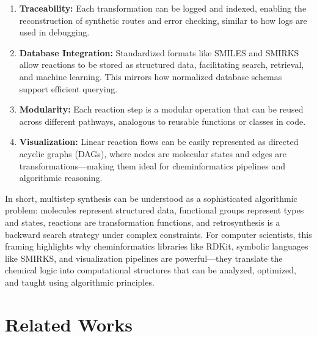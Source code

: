 \documentclass[12pt]{article}
\begin{document}
\begin{enumerate}
    \item \textbf{Traceability:} Each transformation can be logged and indexed, enabling the reconstruction of synthetic routes and error checking, similar to how logs are used in debugging.
    \item \textbf{Database Integration:} Standardized formats like SMILES and SMIRKS allow reactions to be stored as structured data, facilitating search, retrieval, and machine learning. This mirrors how normalized database schemas support efficient querying.
    \item \textbf{Modularity:} Each reaction step is a modular operation that can be reused across different pathways, analogous to reusable functions or classes in code.
    \item \textbf{Visualization:} Linear reaction flows can be easily represented as directed acyclic graphs (DAGs), where nodes are molecular states and edges are transformations—making them ideal for cheminformatics pipelines and algorithmic reasoning.
\end{enumerate}
\indent
In short, multistep synthesis can be understood as a sophisticated algorithmic problem: molecules represent structured data, functional groups represent types and states, reactions are transformation functions, and retrosynthesis is a backward search strategy under complex constraints.
For computer scientists, this framing highlights why cheminformatics libraries like RDKit, symbolic languages like SMIRKS, and visualization pipelines are powerful—they translate the chemical logic into computational structures that can be analyzed, optimized, and taught using algorithmic principles.
\\

    
\section{Related Works}
\end{document}

